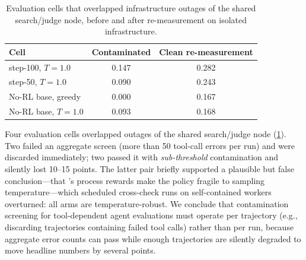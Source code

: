 \begin{table}[t]
\centering
\small
\begin{tabular}{lcc}
\toprule
Cell & Contaminated & Clean re-measurement \\
\midrule
\foldgrpo{} step-100, $T{=}1.0$ & 0.147 & 0.282 \\
\foldgrpo{} step-50, $T{=}1.0$ & 0.090 & 0.243 \\
No-RL base, greedy & 0.000 & 0.167 \\
No-RL base, $T{=}1.0$ & 0.093 & 0.168 \\
\bottomrule
\end{tabular}
\caption{Evaluation cells that overlapped infrastructure outages of the shared search/judge
node, before and after re-measurement on isolated infrastructure.}
\label{tab:contamination}
\end{table}

Four evaluation cells overlapped outages of the shared search/judge node
(\cref{tab:contamination}). Two failed an aggregate screen (more than 50 tool-call errors per
run) and were discarded immediately; two passed it with \emph{sub-threshold} contamination and
silently lost 10--15 points. The latter pair briefly supported a plausible but false
conclusion---that \foldgrpo{}'s process rewards make the policy fragile to sampling
temperature---which scheduled cross-check runs on self-contained workers overturned: all arms
are temperature-robust. We conclude that contamination screening for tool-dependent agent
evaluations must operate per trajectory (e.g., discarding trajectories containing failed tool
calls) rather than per run, because aggregate error counts can pass while enough trajectories
are silently degraded to move headline numbers by several points.
